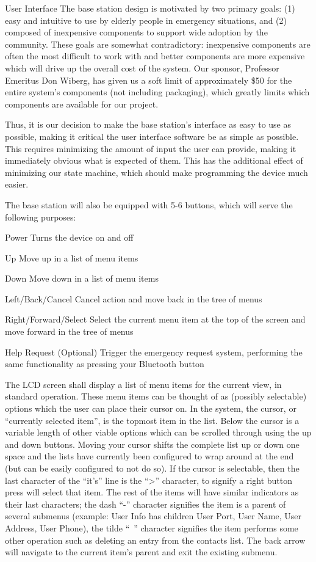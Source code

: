 \documentclass[journal]{IEEEtran}
\begin{document}
User Interface
The base station design is motivated by two primary goals: (1) easy and intuitive to use by elderly people in emergency situations, and (2) composed of inexpensive components to support wide adoption by the community.  These goals are somewhat contradictory: inexpensive components are often the most difficult to work with and better components are more expensive which will drive up the overall cost of the system.  Our sponsor, Professor Emeritus Don Wiberg, has given us a soft limit of approximately \$50 for the entire system’s components (not including packaging), which greatly limits which components are available for our project.

Thus, it is our decision to make the base station’s interface as easy to use as possible, making it critical the user interface software be as simple as possible.  This requires minimizing the amount of input the user can provide, making it immediately obvious what is expected of them.  This has the additional effect of minimizing our state machine, which should make programming the device much easier.

The base station will also be equipped with 5-6 buttons, which will serve the following purposes:

\begin{LaTeXdescription}
\item[Power] Turns the device on and off
\item[Up] Move up in a list of menu items
\item[Down] Move down in a list of menu items
\item[Left/Back/Cancel] Cancel action and move back in the tree of menus
\item[Right/Forward/Select] Select the current menu item at the top of the screen and move forward in the tree of menus
\item[Help Request (Optional)] Trigger the emergency request system, performing the same functionality as pressing your Bluetooth button
\end{LaTeXdescription}

The LCD screen shall display a list of menu items for the current view, in standard operation.  These menu items can be thought of as (possibly selectable) options which the user can place their cursor on.  In the system, the cursor, or “currently selected item”, is the topmost item in the list.  Below the cursor is a variable length of other viable options which can be scrolled through using the up and down buttons.  Moving your cursor shifts the complete list up or down one space and the lists have currently been configured to wrap around at the end (but can be easily configured to not do so).  If the cursor is selectable, then the last character of the “it’s” line is the “>” character, to signify a right button press will select that item.  The rest of the items will have similar indicators as their last characters; the dash “-” character signifies the item is a parent of several submenus (example:  User Info has children {User Port, User Name, User Address, User Phone}), the tilde “~” character signifies the item performs some other operation such as deleting an entry from the contacts list.  The back arrow will navigate to the current item’s parent and exit the existing submenu.
\end{document}
